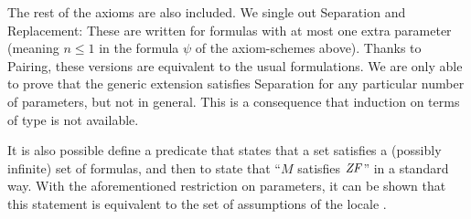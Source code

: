 The rest of the axioms are also included. We single out Separation and
Replacement: These are written for formulas with at most one extra
parameter (meaning $n\leq 1$ in the formula $\psi$ of the
axiom-schemes above). Thanks to Pairing, these versions are equivalent
to the usual formulations. We are only able to prove that the generic
extension satisfies Separation for any particular number of
parameters, but not in general. This is a consequence that induction
on terms of type \tyo{} is not available.

It is also possible define a predicate that states that a set
satisfies a (possibly infinite) set of formulas, and then to state
that ``$M$ satisfies $\mathit{ZF}$'' in a standard way. With the
aforementioned restriction on parameters, it can be shown that this
statement is equivalent to the set of assumptions of the locale
.
%
